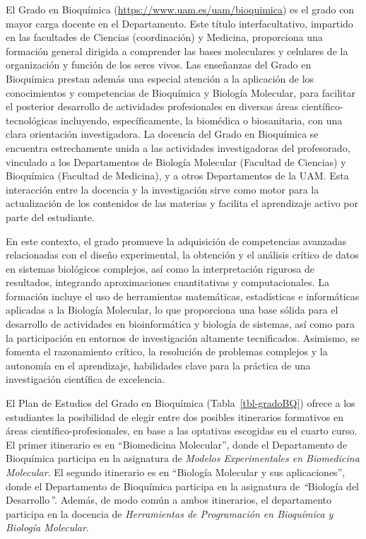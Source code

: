 \documentclass[
  11pt,
  a4paper,
  twoside]{scrreprt}
\begin{document}
El Grado en Bioquímica (\url{https://www.uam.es/uam/bioquimica}) es el
grado con mayor carga docente en el Departamento. Este título
interfacultativo, impartido en las facultades de Ciencias (coordinación)
y Medicina, proporciona una formación general dirigida a comprender las
bases moleculares y celulares de la organización y función de los seres
vivos. Las enseñanzas del Grado en Bioquímica prestan además una
especial atención a la aplicación de los conocimientos y competencias de
Bioquímica y Biología Molecular, para facilitar el posterior desarrollo
de actividades profesionales en diversas áreas científico-tecnológicas
incluyendo, específicamente, la biomédica o biosanitaria, con una clara
orientación investigadora. La docencia del Grado en Bioquímica se
encuentra estrechamente unida a las actividades investigadoras del
profesorado, vinculado a los Departamentos de Biología Molecular
(Facultad de Ciencias) y Bioquímica (Facultad de Medicina), y a otros
Departamentos de la UAM. Esta interacción entre la docencia y la
investigación sirve como motor para la actualización de los contenidos
de las materias y facilita el aprendizaje activo por parte del
estudiante.

En este contexto, el grado promueve la adquisición de competencias
avanzadas relacionadas con el diseño experimental, la obtención y el
análisis crítico de datos en sistemas biológicos complejos, así como la
interpretación rigurosa de resultados, integrando aproximaciones
cuantitativas y computacionales. La formación incluye el uso de
herramientas matemáticas, estadísticas e informáticas aplicadas a la
Biología Molecular, lo que proporciona una base sólida para el
desarrollo de actividades en bioinformática y biología de sistemas, así
como para la participación en entornos de investigación altamente
tecnificados. Asimismo, se fomenta el razonamiento crítico, la
resolución de problemas complejos y la autonomía en el aprendizaje,
habilidades clave para la práctica de una investigación científica de
excelencia.

El Plan de Estudios del Grado en Bioquímica (Tabla~\ref{tbl-gradoBQ})
ofrece a los estudiantes la posibilidad de elegir entre dos posibles
itinerarios formativos en áreas científico-profesionales, en base a las
optativas escogidas en el cuarto curso. El primer itinerario es en
``Biomedicina Molecular'', donde el Departamento de Bioquímica participa
en la asignatura de \emph{Modelos Experimentales en Biomedicina
Molecular}. El segundo itinerario es en ``Biología Molecular y sus
aplicaciones'', donde el Departamento de Bioquímica participa en la
asignatura de \emph{``}Biología del Desarrollo\emph{''}. Además, de modo
común a ambos itinerarios, el departamento participa en la docencia de
\emph{Herramientas de Programación en Bioquímica y Biología Molecular}.
\end{document}
